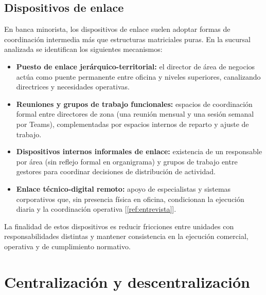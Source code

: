 \subsection{Dispositivos de enlace}


En banca minorista, los dispositivos de enlace suelen adoptar formas de coordinación
intermedia más que estructuras matriciales puras. En la sucursal analizada se
identifican los siguientes mecanismos:

\begin{itemize}
	\item \textbf{Puesto de enlace jerárquico-territorial:} el director de área de
		negocios actúa como puente permanente entre oficina y niveles superiores,
		canalizando directrices y necesidades operativas.
	\item \textbf{Reuniones y grupos de trabajo funcionales:} espacios de
		coordinación formal entre directores de zona (una reunión mensual y una sesión
		semanal por Teams), complementadas por espacios internos de reparto y ajuste
		de trabajo.
	\item \textbf{Dispositivos internos informales de enlace:} existencia de un
		responsable por área (sin reflejo formal en organigrama) y grupos de trabajo
		entre gestores para coordinar decisiones de distribución de actividad.
	\item \textbf{Enlace técnico-digital remoto:} apoyo de especialistas y sistemas
		corporativos que, sin presencia física en oficina, condicionan la ejecución
		diaria y la coordinación operativa [\ref{ref:entrevista}].
\end{itemize}

La finalidad de estos dispositivos es reducir fricciones entre unidades con
responsabilidades distintas y mantener consistencia en la ejecución comercial,
operativa y de cumplimiento normativo.

\section{Centralización y descentralización}


%
%
%

